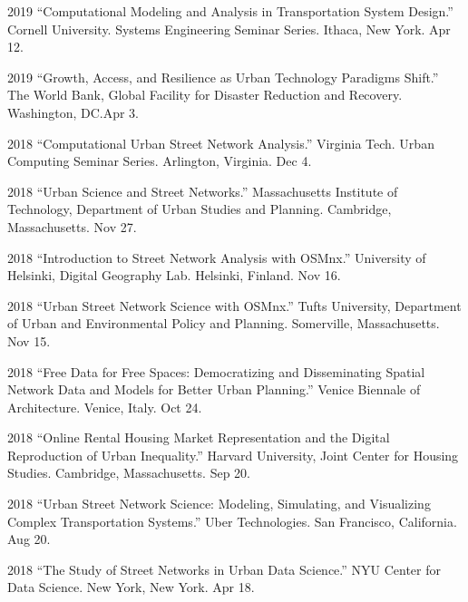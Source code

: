 \documentclass[11pt,letterpaper]{report}
\begin{document}
\begin{tablist}
        \item[2019] \tab{}\enquote{Computational Modeling and Analysis in Transportation System Design.} Cornell University. Systems Engineering Seminar Series. Ithaca, New York. Apr 12.

        \item[2019] \tab{}\enquote{Growth, Access, and Resilience as Urban Technology Paradigms Shift.} The World Bank, Global Facility for Disaster Reduction and Recovery. Washington, DC.\@ Apr 3.

        \item[2018] \tab{}\enquote{Computational Urban Street Network Analysis.} Virginia Tech. Urban Computing Seminar Series. Arlington, Virginia. Dec 4.

        \item[2018] \tab{}\enquote{Urban Science and Street Networks.} Massachusetts Institute of Technology, Department of Urban Studies and Planning. Cambridge, Massachusetts. Nov 27.

        \item[2018] \tab{}\enquote{Introduction to Street Network Analysis with OSMnx.} University of Helsinki, Digital Geography Lab. Helsinki, Finland. Nov 16.

        \item[2018] \tab{}\enquote{Urban Street Network Science with OSMnx.} Tufts University, Department of Urban and Environmental Policy and Planning. Somerville, Massachusetts. Nov 15.

        \item[2018] \tab{}\enquote{Free Data for Free Spaces: Democratizing and Disseminating Spatial Network Data and Models for Better Urban Planning.} Venice Biennale of Architecture. Venice, Italy. Oct 24.

        \item[2018] \tab{}\enquote{Online Rental Housing Market Representation and the Digital Reproduction of Urban Inequality.} Harvard University, Joint Center for Housing Studies. Cambridge, Massachusetts. Sep 20.

        \item[2018] \tab{}\enquote{Urban Street Network Science: Modeling, Simulating, and Visualizing Complex Transportation Systems.} Uber Technologies. San Francisco, California. Aug 20.

        \item[2018] \tab{}\enquote{The Study of Street Networks in Urban Data Science.} NYU Center for Data Science. New York, New York. Apr 18.


\end{tablist}
\end{document}
